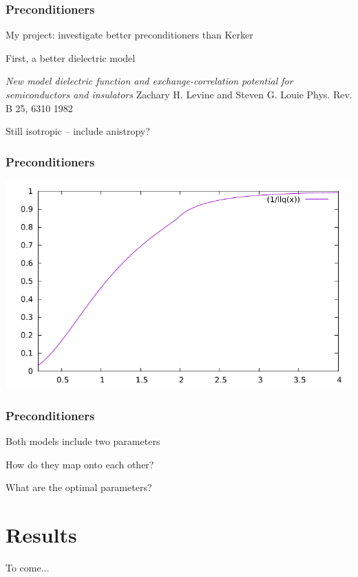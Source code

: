 \documentclass{beamer}
\begin{document}
\begin{frame}

\frametitle{Preconditioners}

My project: investigate better preconditioners than Kerker

\vspace{0.4cm}

First, a better dielectric model

\vspace{0.4cm}

\textit{New model dielectric function and exchange-correlation potential for semiconductors and insulators}
Zachary H. Levine and Steven G. Louie
Phys. Rev. B 25, 6310 1982

\vspace{0.4cm}

Still isotropic -- include anistropy?

\end{frame}



\begin{frame}

\frametitle{Preconditioners}

\includegraphics[width=1\linewidth]{LL.pdf}



\end{frame}


\begin{frame}

\frametitle{Preconditioners}

Both models include two parameters

\vspace{0.4cm}

How do they map onto each other?

\vspace{0.4cm}

What are the optimal parameters?

\end{frame}





\section{Results}
\begin{frame} 



To come...


\end{frame}

\end{document}
